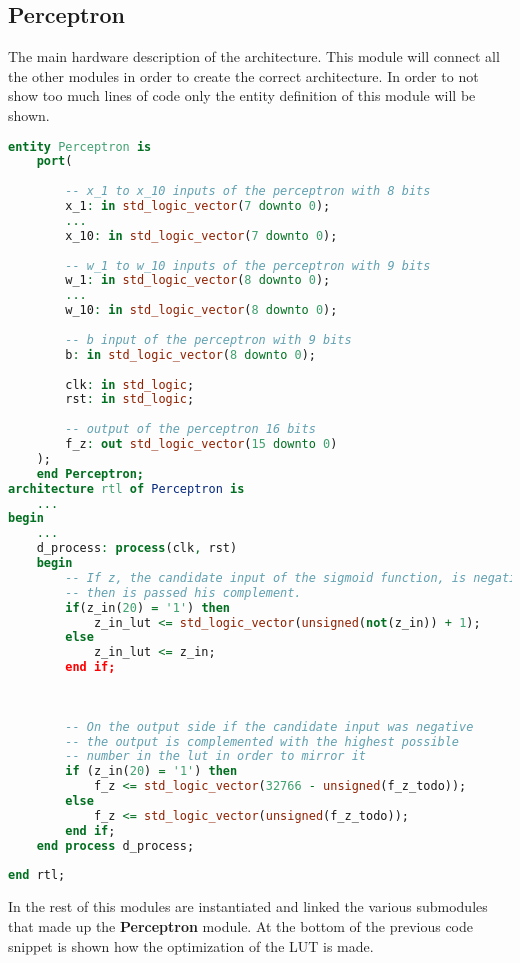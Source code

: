 \subsection{Perceptron}
The main hardware description of the architecture. This module will connect all the other modules in order to create the correct architecture. In order to not show too much lines of code only the entity definition of this module will be shown.
\begin{lstlisting}[language=VHDL]
	entity Perceptron is
	port(
	
		-- x_1 to x_10 inputs of the perceptron with 8 bits
		x_1: in std_logic_vector(7 downto 0);
		...
		x_10: in std_logic_vector(7 downto 0);
		
		-- w_1 to w_10 inputs of the perceptron with 9 bits
		w_1: in std_logic_vector(8 downto 0);
		...
		w_10: in std_logic_vector(8 downto 0);
		
		-- b input of the perceptron with 9 bits
		b: in std_logic_vector(8 downto 0);
		
		clk: in std_logic;
		rst: in std_logic;
		
		-- output of the perceptron 16 bits
		f_z: out std_logic_vector(15 downto 0)
	);
	end Perceptron;
architecture rtl of Perceptron is
	...
begin
	...
	d_process: process(clk, rst)
	begin
		-- If z, the candidate input of the sigmoid function, is negative,
		-- then is passed his complement.
		if(z_in(20) = '1') then
			z_in_lut <= std_logic_vector(unsigned(not(z_in)) + 1);
		else
			z_in_lut <= z_in;
		end if;
		
		
		
		-- On the output side if the candidate input was negative
		-- the output is complemented with the highest possible
		-- number in the lut in order to mirror it
		if (z_in(20) = '1') then 
			f_z <= std_logic_vector(32766 - unsigned(f_z_todo));
		else
			f_z <= std_logic_vector(unsigned(f_z_todo));
		end if;
	end process d_process;
	
end rtl; 
\end{lstlisting}

In the rest of this modules are instantiated and linked the various submodules that made up the \textbf{Perceptron} module. At the bottom of the previous code snippet is shown how the optimization of the LUT is made. 

